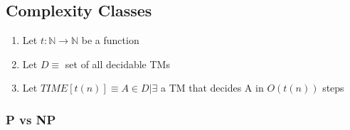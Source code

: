 \documentclass[11pt]{article}
\begin{document}
\subsection{Complexity Classes}
\label{sec-7.2}

\begin{enumerate}
\item Let $t: \mathbb{N} \rightarrow \mathbb{N}$ be a function
\item Let $D \equiv$ set of all decidable TMs
\item Let $TIME[t(n)] \equiv {A \in D | \exists}$ a TM that decides A
      in $O(t(n))$ steps
\end{enumerate}
\subsubsection{P vs NP}
\label{sec-7.2.1}
\end{document}
